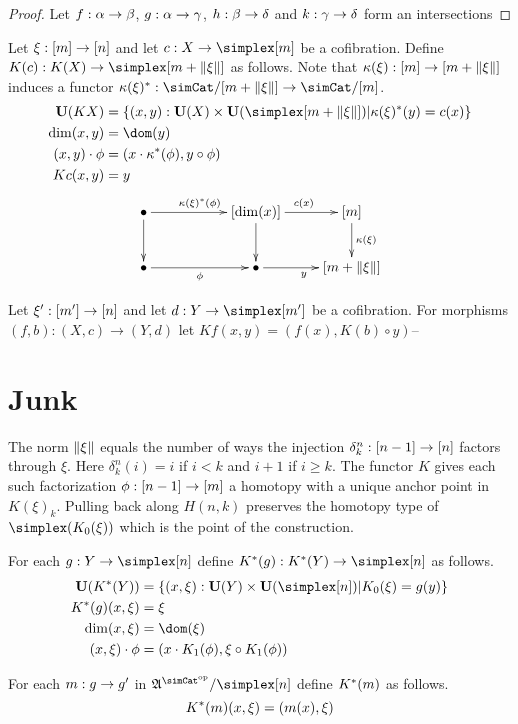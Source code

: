 \documentclass[csh.tex]{subfiles}
\begin{document}
\begin{proof} Let $f:\alpha\to\beta$, $g:\alpha\to\gamma$, $h:\beta\to\delta$ and $k:\gamma\to\delta$ form an intersections

\end{proof}


\begin{definition} Let $\xi:[m]\to[n]$ and let $c\of X\to\simplex [m]$ be a cofibration. Define $K(c)\of K(X) \to \simplex[m+\norm\xi]$ as follows. Note that $\kappa(\xi):[m]\to[m+\Vert \xi \Vert]$ induces a functor $\kappa(\xi)\ri\of\simCat/[m+\norm\xi]\to\simCat/[m]$.
\begin{align*}
\base(KX) &= \set{(x,y)\of\base(X)\times\base(\simplex[m+\norm\xi]) | \kappa(\xi)\ri(y) = c(x) }\\
\dim(x,y)&= \dom(y)\\
(x,y)\cdot\phi &= (x\cdot \kappa\ri(\phi),y\circ\phi)\\
Kc(x,y) &= y
\end{align*}
\[\xymatrix{
\bullet \ar[rr]^{\kappa(\xi)\ri(\phi)}\ar[d] && [\dim(x)] \ar[r]^{c(x)}\ar[d] & [m]\ar[d]^{\kappa(\xi)} \\
\bullet \ar[rr]_\phi && \bullet \ar[r]_y & [m+\norm\xi]
}\]

Let $\xi': [m']\to[n]$ and let $d\of Y\to \simplex[m']$ be a cofibration. For morphisms $(f,b):(X,c)\to (Y,d)$ let $Kf(x,y) = (f(x),K(b)\circ y)$--%
\end{definition}



\section{Junk}
The norm $\Vert \xi \Vert$ equals the number of ways the injection $\delta^n_k:[n-1]\to[n]$ factors through $\xi$. Here $\delta^n_k(i)=i$ if $i<k$ and $i+1$ if $i\geq k$. The functor $K$ gives each such factorization $\phi:[n-1]\to [m]$ a homotopy with a unique anchor point in $K(\xi)_k$.  Pulling back along $H(n,k)$ preserves the homotopy type of $\simplex(K_0(\xi))$ which is the point of the construction. %



\begin{definition} For each $g\of Y\to \simplex[n]$ define $K\ri(g)\of K\ri(Y) \to \simplex [n]$ as follows.
\begin{align*}
\base(K\ri(Y)) &= \set{(x,\xi)\of\base(Y)\times\base(\simplex[n])| K_0(\xi) = g(y) }\\
K\ri(g)(x,\xi) &= \xi\\
\dim(x,\xi) &= \dom(\xi)\\
(x,\xi)\cdot \phi &= (x\cdot K_1(\phi),\xi\circ K_1(\phi))
\end{align*}

For each $m: g\to g'$ in $\ambient\s/\simplex[n]$ define $K^*(m)$ as follows.
\[ K^*(m)(x,\xi) = (m(x),\xi) \]
\end{definition}
\end{document}
